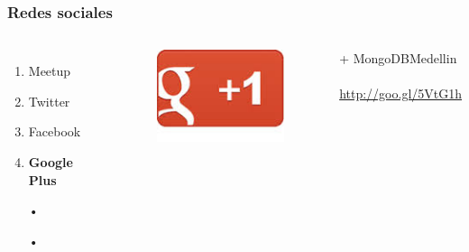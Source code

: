 \documentclass{beamer}
\begin{document}
\begin{frame}
\frametitle{Redes sociales}
\begin{columns}[c] %

\begin{enumerate}
\item Meetup
\item Twitter
\item Facebook
\item \textbf{Google Plus}
\item[•]	
\item[•]	
\end{enumerate}

\begin{figure}
\includegraphics[width=0.5\linewidth]{gplus.png}
\end{figure}
{\color{blue}+ MongoDBMedellin}
\\~\\
{\color{blue}\url{http://goo.gl/5VtG1h}}
\end{columns}
\end{frame}
\end{document}
